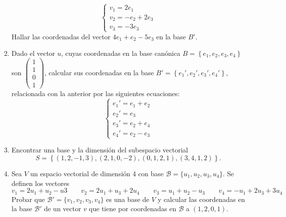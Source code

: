 \documentclass[12pt]{article}
\begin{document}
\begin{enumerate}
  $$
  \begin{cases}
    v_1 = 2e_1\\
    v_2 = -e_2+2e_3\\
    v_3 = -3e_3
  \end{cases}
  $$
  Hallar las coordenadas del vector $4e_1+e_2-5e_3$ en la base $B'$.
  \item Dado el vector $u$, cuyas coordenadas en la base canónica $B=\left\{e_1,e_2,e_3,e_4\right\}$ son $\begin{pmatrix}
    1\\1\\0\\1
  \end{pmatrix}$, calcular sus coordenadas en la base $B'=\left\{e_1',e_2',e_3',e_4'\right\}$, relacionada con la anterior por las siguientes ecuaciones:
  $$
  \begin{cases}
    e_1'=e_1+e_2\\
    e_2'=e_3\\
    e_3'=e_2+e_4\\
    e_4'=e_2-e_3
  \end{cases}
  $$
  \item Encontrar una base y la dimensión del subespacio vectorial
  $$
  S =\left\{(1, 2, -1, 3), (2, 1, 0, -2), (0, 1, 2, 1), (3, 4, 1, 2)\right\}.
  $$
  \item Sea $V$ un espacio vectorial de dimensión 4 con base $\mathcal{B} = \{u_1 , u_2 , u_3 , u_4 \}$. Se definen los vectores
  $$
  v_1 = 2u_1 + u_2 - u3 \qquad
  v_2 = 2u_1 + u_3 + 2u_4 \qquad
  v_3 = u_1 + u_2 - u_3 \qquad
  v_4 = -u_1 + 2u_3 + 3u_4
  $$
  Probar que $\mathcal{B'} = \{v_1 , v_2 , v_3 , v_4 \}$ es una base de $V$ y calcular las coordenadas en la base $\mathcal{B'}$ de un vector  $v$ que tiene por coordenadas en $\mathcal{B}$ a $(1, 2, 0, 1)$.

\end{enumerate}
\end{document}
